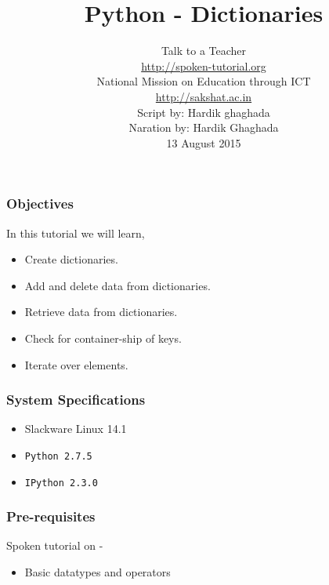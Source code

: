 \documentclass[17pt,compress]{beamer}
\author[FOSSEE]{}
\institute[IIT Bombay]{}
\date[]{}
\begin{document}
\sffamily \bfseries
\title
[Dictionaries]
{Python - Dictionaries}
\author
[FOSSEE, IIT - Bombay]
{\small Talk to a Teacher\\{\color{blue}\url{http://spoken-tutorial.org}}\\National Mission on Education
 through ICT\\{\color{blue}\url{http://sakshat.ac.in}} \\[0.5cm]{\tiny Script by: Hardik ghaghada \\ Naration by: Hardik Ghaghada \\ 13 August 2015}}

\begin{frame}
   \titlepage
\end{frame}
\begin{frame}
\frametitle{Objectives}
\label{sec-2}

  In this tutorial we will learn, \pause
\begin{itemize}
\item Create dictionaries.\pause
\item Add and delete data from dictionaries.\pause
\item Retrieve data from dictionaries.\pause
\item Check for container-ship of keys.\pause
\item Iterate over elements.
\end{itemize}
\end{frame}
\begin{frame}
\frametitle{System Specifications}\pause
\begin{itemize}
\item Slackware Linux 14.1\pause
\item \texttt{Python 2.7.5} \pause
\item \texttt{IPython 2.3.0}
\end{itemize}
\end{frame}
\begin{frame}
\frametitle{Pre-requisites}
\label{sec-3}

Spoken tutorial on -
\begin{itemize}
\item Basic datatypes and operators
\end{itemize}
\end{frame}
\end{document}
